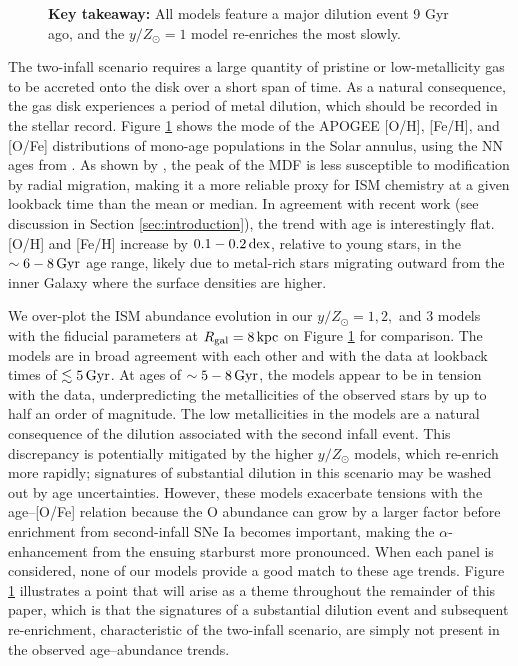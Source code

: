 \documentclass[twocolumn,twocolappendix,linenumbers]{aastex631}
\newcommand{\yZ}[1]{$y/Z_\odot=#1$}
\newcommand{\kpc}{\,{\rm kpc}}
\newcommand{\Gyr}{\,{\rm Gyr}}
\newcommand{\dex}{\,{\rm dex}}
\begin{document}
\begin{figure}
{    {\bf Key takeaway:} All models feature a major dilution event 9 Gyr ago, and the \yZ{1} model re-enriches the most slowly.}
    \label{fig:yield-outflow}
\end{figure}

The two-infall scenario requires a large quantity of pristine or low-metallicity gas to be accreted onto the disk over a short span of time. As a natural consequence, the gas disk experiences a period of metal dilution, which should be recorded in the stellar record. Figure \ref{fig:yield-outflow} shows the mode of the APOGEE [O/H], [Fe/H], and [O/Fe] distributions of mono-age populations in the Solar annulus, using the NN ages from \citet{leung_variational_2023}. As shown by \citet{johnson_milky_2024}, the peak of the MDF is less susceptible to modification by radial migration, making it a more reliable proxy for ISM chemistry at a given lookback time than the mean or median. In agreement with recent work (see discussion in Section \ref{sec:introduction}), the trend with age is interestingly flat. [O/H] and [Fe/H] increase by $0.1-0.2\dex$, relative to young stars, in the $\sim6-8\Gyr$ age range, likely due to metal-rich stars migrating outward from the inner Galaxy where the surface densities are higher.

We over-plot the ISM abundance evolution in our $y/Z_\odot=1,2,$ and $3$ models with the fiducial parameters at $R_{\rm gal}=8\kpc$ on Figure \ref{fig:yield-outflow} for comparison. The models are in broad agreement with each other and with the data at lookback times of $\lesssim5\Gyr$. At ages of $\sim5-8\Gyr$, the models appear to be in tension with the data, underpredicting the metallicities of the observed stars by up to half an order of magnitude. The low metallicities in the models are a natural consequence of the dilution associated with the second infall event. This discrepancy is potentially mitigated by the higher $y/Z_\odot$ models, which re-enrich more rapidly; signatures of substantial dilution in this scenario may be washed out by age uncertainties. However, these models exacerbate tensions with the age--[O/Fe] relation because the O abundance can grow by a larger factor before enrichment from second-infall SNe Ia becomes important, making the $\alpha$-enhancement from the ensuing starburst more pronounced. When each panel is considered, none of our models provide a good match to these age trends. Figure \ref{fig:yield-outflow} illustrates a point that will arise as a theme throughout the remainder of this paper, which is that the signatures of a substantial dilution event and subsequent re-enrichment, characteristic of the two-infall scenario, are simply not present in the observed age--abundance trends.
\end{document}
